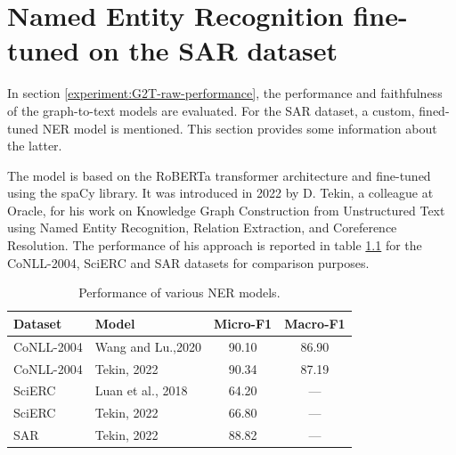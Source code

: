 \chapter{Named Entity Recognition fine-tuned on the SAR dataset} \label{appendix:custom-ner-sar}

In section \ref{experiment:G2T-raw-performance}, the performance and faithfulness of the graph-to-text models are evaluated. For the SAR dataset, a custom, fined-tuned NER model is mentioned. This section provides some information about the latter. 


The model is based on the RoBERTa transformer architecture and fine-tuned using the spaCy library. It was introduced in 2022 by D. Tekin, a colleague at Oracle, for his work on 
Knowledge Graph Construction from Unstructured Text using Named Entity Recognition, Relation Extraction, and Coreference Resolution. The performance of his approach is reported in table \ref{tab:NER-doga-performance} for the CoNLL-2004\cite{CoNLL4},  SciERC\cite{SciERC} and SAR datasets for comparison purposes.


\begin{table}[!ht]
    \centering
    \begin{tabular}{llcc}
    \toprule
        Dataset        & Model      & Micro-F1 & Macro-F1  \\
    \midrule
        CoNLL-2004     & Wang and Lu.,2020\cite{Lu2020} & 90.10 & 86.90 \\
        CoNLL-2004     & Tekin, 2022 & 90.34 & 87.19 \\
        SciERC         &  Luan et al.\cite{SciERC}, 2018 & 64.20 & --- \\
        SciERC         & Tekin, 2022 & 66.80 & --- \\
        SAR            & Tekin, 2022 & 88.82 & --- \\             
         \bottomrule
    \end{tabular}
    \caption{Performance of various NER models.}
    \label{tab:NER-doga-performance}
\end{table}

